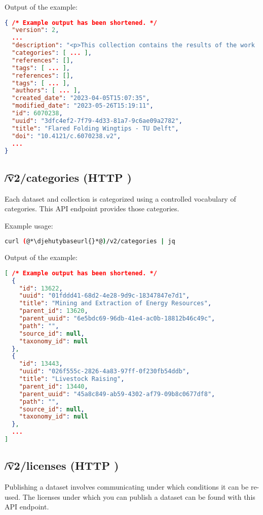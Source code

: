   Output of the example:
\begin{lstlisting}[language=JSON]
{ /* Example output has been shortened. */
  "version": 2,
  ...
  "description": "<p>This collection contains the results of the work ...",
  "categories": [ ... ],
  "references": [],
  "tags": [ ... ],
  "references": [],
  "tags": [ ... ],
  "authors": [ ... ],
  "created_date": "2023-04-05T15:07:35",
  "modified_date": "2023-05-26T15:19:11",
  "id": 6070238,
  "uuid": "3dfc4ef2-7f79-4d33-81a7-9c6ae09a2782",
  "title": "Flared Folding Wingtips - TU Delft",
  "doi": "10.4121/c.6070238.v2",
  ...
}
\end{lstlisting}

\subsection{\t{/v2/categories} (HTTP )}
\label{sec:v2-categories}

  Each dataset and collection is categorized using a controlled vocabulary
  of categories.  This API endpoint provides those categories.

  Example usage:
\begin{lstlisting}[language=bash]
curl (@*\djehutybaseurl{}*@)/v2/categories | jq
\end{lstlisting}

  Output of the example:
\begin{lstlisting}[language=JSON]
[ /* Example output has been shortened. */
  {
    "id": 13622,
    "uuid": "01fddd41-68d2-4e28-9d9c-18347847e7d1",
    "title": "Mining and Extraction of Energy Resources",
    "parent_id": 13620,
    "parent_uuid": "6e5bdc69-96db-41e4-ac0b-18812b46c49c",
    "path": "",
    "source_id": null,
    "taxonomy_id": null
  },
  {
    "id": 13443,
    "uuid": "026f555c-2826-4a83-97ff-0f230fb54ddb",
    "title": "Livestock Raising",
    "parent_id": 13440,
    "parent_uuid": "45a8c849-ab59-4302-af79-09b8c0677df8",
    "path": "",
    "source_id": null,
    "taxonomy_id": null
  },
  ...
]
\end{lstlisting}

\subsection{\t{/v2/licenses} (HTTP )}
\label{sec:v2-licenses}

  Publishing a dataset involves communicating under which conditions it can be
  re-used.  The licenses under which you can publish a dataset can be found with
  this API endpoint.

